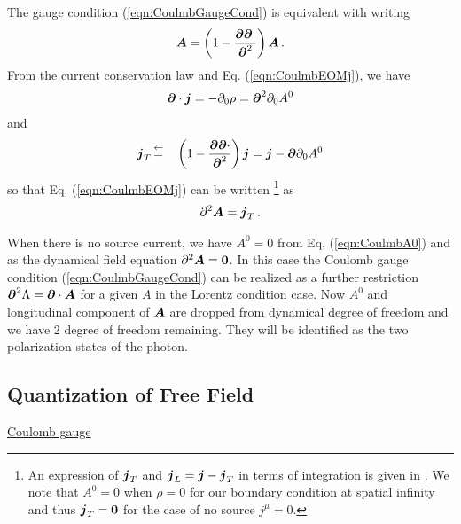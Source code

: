 The gauge condition (\ref{eqn:CoulmbGaugeCond}) is
equivalent with writing
\begin{eqnarray}
\mbox{\boldmath $A$} =
\left(
1
-
\frac{\mbox{\boldmath $\partial$} \mbox{\boldmath $\partial$} \cdot}
{\mbox{\boldmath $\partial$}^2}
\right)
\mbox{\boldmath $A$}\,.
\label{eqn:CoulmbProjection}
\end{eqnarray}
From the current conservation law 
and Eq. (\ref{eqn:CoulmbEOMj}), we have
\begin{eqnarray}
\mbox{\boldmath $\partial$}\cdot \mbox{\boldmath $j$}
= -\partial_0 \rho
= \mbox{\boldmath $\partial$}^2 \partial_0 A^0
\end{eqnarray}
and
\begin{eqnarray}
\mbox{\boldmath $j$}_T
&\,\mbox{$\stackrel{\leftarrow}{=}$}\,&
\left(
1 -
\frac{\mbox{\boldmath $\partial$} \mbox{\boldmath $\partial$} \cdot}
{\mbox{\boldmath $\partial$}^2}
\right)
\mbox{\boldmath $j$}
=
\mbox{\boldmath $j$} -
\mbox{\boldmath $\partial$} \partial_0 A^0
\end{eqnarray}
so that Eq. (\ref{eqn:CoulmbEOMj}) 
can be written
\footnote{%
An expression of $\mbox{\boldmath $j$}_T$ and $\mbox{\boldmath $j$}_L = \mbox{\boldmath $j$} -\mbox{\boldmath $j$}_T$ in terms of integration is given in
\cite{ref:Jackson}.
We note that $A^0 = 0$ when $\rho = 0$ for our boundary condition at spatial infinity and
thus $\mbox{\boldmath $j$}_T = \mbox{\boldmath $0$}$ for the case of no source $j^\mu = 0$.
}%
 as
\begin{eqnarray}
\partial^2 \mbox{\boldmath $A$}
=
\mbox{\boldmath $j$}_T \,.
\end{eqnarray}

When there is no source current, we have $A^0 = 0$ from Eq. (\ref{eqn:CoulmbA0}) and
as the dynamical field equation $\partial^2 \mbox{\boldmath $A$}  = \mbox{\boldmath $0$}$.
In this case the Coulomb gauge condition (\ref{eqn:CoulmbGaugeCond}) can be
realized as a further restriction $\mbox{\boldmath $\partial$}^2 \Lambda = \mbox{\boldmath $\partial$} \cdot \mbox{\boldmath $A$}$ for a
given $A$ in the Lorentz condition case.
Now $A^0$ and longitudinal component of $\mbox{\boldmath $A$}$ are dropped from dynamical degree of
freedom and we have 2 degree of freedom remaining. They will be identified as the two
polarization states of the photon.

\subsection{Quantization of Free Field}
\noindent
\underline{Coulomb gauge}\\

